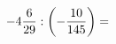 \documentclass[preview]{standalone}
\begin{document}
\begin{align*}
-4 { 6 \over 29 }  :  \left( - { 10 \over 145 } \right)  =
\end{align*}
\end{document}
